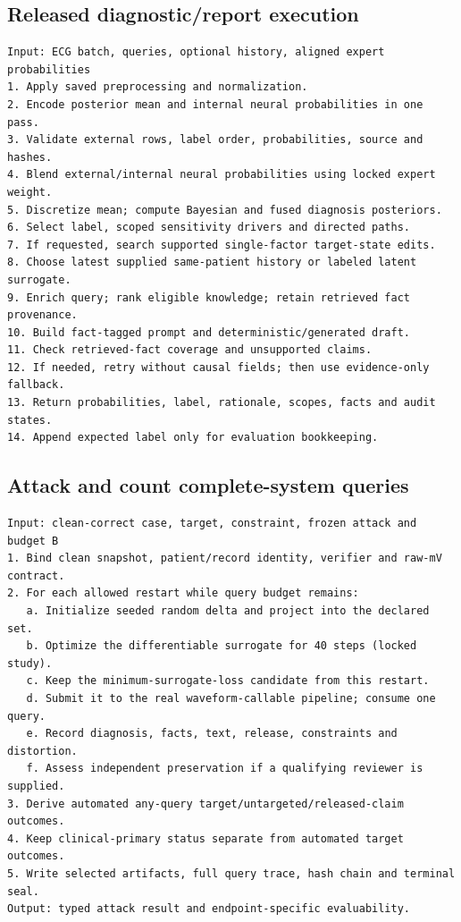 \subsection{Released diagnostic/report execution}
\begin{lstlisting}
Input: ECG batch, queries, optional history, aligned expert probabilities
1. Apply saved preprocessing and normalization.
2. Encode posterior mean and internal neural probabilities in one pass.
3. Validate external rows, label order, probabilities, source and hashes.
4. Blend external/internal neural probabilities using locked expert weight.
5. Discretize mean; compute Bayesian and fused diagnosis posteriors.
6. Select label, scoped sensitivity drivers and directed paths.
7. If requested, search supported single-factor target-state edits.
8. Choose latest supplied same-patient history or labeled latent surrogate.
9. Enrich query; rank eligible knowledge; retain retrieved fact provenance.
10. Build fact-tagged prompt and deterministic/generated draft.
11. Check retrieved-fact coverage and unsupported claims.
12. If needed, retry without causal fields; then use evidence-only fallback.
13. Return probabilities, label, rationale, scopes, facts and audit states.
14. Append expected label only for evaluation bookkeeping.
\end{lstlisting}

\subsection{Attack and count complete-system queries}
\begin{lstlisting}
Input: clean-correct case, target, constraint, frozen attack and budget B
1. Bind clean snapshot, patient/record identity, verifier and raw-mV contract.
2. For each allowed restart while query budget remains:
   a. Initialize seeded random delta and project into the declared set.
   b. Optimize the differentiable surrogate for 40 steps (locked study).
   c. Keep the minimum-surrogate-loss candidate from this restart.
   d. Submit it to the real waveform-callable pipeline; consume one query.
   e. Record diagnosis, facts, text, release, constraints and distortion.
   f. Assess independent preservation if a qualifying reviewer is supplied.
3. Derive automated any-query target/untargeted/released-claim outcomes.
4. Keep clinical-primary status separate from automated target outcomes.
5. Write selected artifacts, full query trace, hash chain and terminal seal.
Output: typed attack result and endpoint-specific evaluability.
\end{lstlisting}

